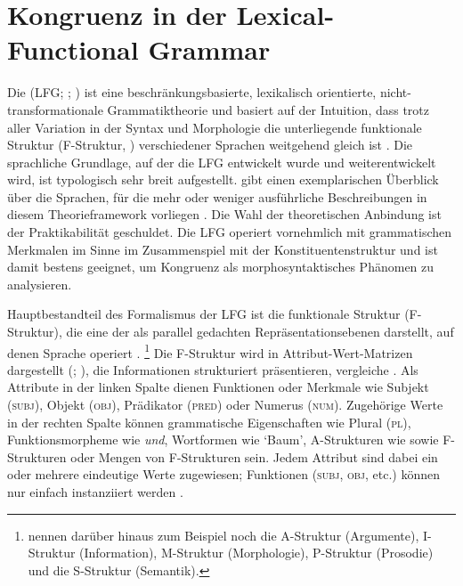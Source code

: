 \section{Kongruenz in der Lexical-Functional Grammar}
\label{sec:lfgkongr}

Die  (LFG;
\cites{kaplanbresnan1982,bresnan2001,bresnanetal2016}; \cites[zur Einführung
z.\,B.][]{buttking2015}[223--246]{mueller2023}) ist eine beschränkungsbasierte,
lexikalisch orientierte, nicht-trans\allowbreak{}formationale Grammatiktheorie
und basiert auf der Intuition, dass trotz aller Variation in der Syntax und
Morphologie die unterliegende funktionale Struktur (F-Struktur,
) verschiedener Sprachen weitgehend gleich ist
\autocite[42]{bresnanetal2016}.
Die sprachliche Grundlage, auf der die LFG entwickelt wurde und
weiterentwickelt wird, ist typologisch sehr breit aufgestellt.
\citet[223--224]{mueller2023} gibt einen exemplarischen Überblick über die
Sprachen, für die mehr oder weniger ausführliche Beschreibungen in diesem
Theorieframework vorliegen \autocites[zum modernen Standarddeutschen
vgl.][]{berman2003}{fortmann2006}. Die Wahl der theoretischen Anbindung ist der
Praktikabilität geschuldet. Die LFG operiert vornehmlich mit grammatischen
Merkmalen im Sinne  im Zusammenspiel mit der
Konstituentenstruktur und ist damit bestens geeignet, um Kongruenz als
morphosyntaktisches Phänomen zu analysieren.

Hauptbestandteil des Formalismus der LFG ist die funktionale Struktur
(F-Struktur), die eine der als parallel gedachten Repräsentationsebenen
darstellt, auf denen Sprache operiert \autocite[840--844]{buttking2015}.%
%
	\footnote{\citet[862--865]{buttking2015} nennen darüber hinaus zum Beispiel
		noch die
		A-Struktur (Argumente),
		I-Struktur (Information),
		M-Struktur (Morphologie),
		P-Struktur (Prosodie)
		und die
		S-Struktur (Semantik).
	}
%
Die F-Struktur wird in Attribut-Wert-Matrizen dargestellt (; \cites[vgl.][44--45]{bresnanetal2016}[207--221]{mueller2023}), die
Informationen strukturiert präsentieren, vergleiche . Als
Attribute in der linken Spalte dienen Funktionen oder Merkmale wie Subjekt
(\textsc{subj}), Objekt (\textsc{obj}), Prädikator (\textsc{pred}) oder
Numerus (\textsc{num}). Zugehörige Werte in der rechten Spalte können
grammatische Eigenschaften wie Plural (\textsc{pl}), Funktionsmorpheme wie
\textit{und}, Wortformen wie `Baum', A-Strukturen wie
 sowie F-Strukturen oder Mengen von
F-Struk\-turen sein. Jedem Attribut sind dabei ein oder mehrere eindeutige
Werte zugewiesen; Funktionen (\textsc{subj}, \textsc{obj}, etc.) können nur
einfach instanziiert werden \autocite[vgl.][44--58]{bresnanetal2016}.

